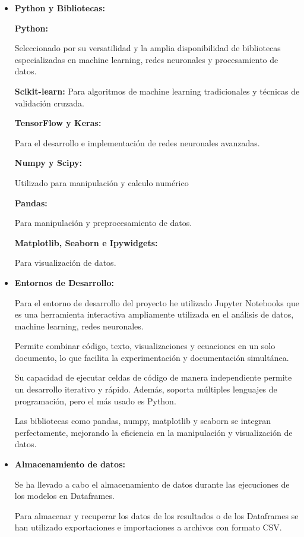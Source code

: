 \begin{itemize}
	
	\item
	\textbf{Python y Bibliotecas:}


\textbf{Python:}

Seleccionado por su versatilidad y la amplia disponibilidad de bibliotecas especializadas en machine learning, redes neuronales y procesamiento de datos.

\textbf{Scikit-learn:}
Para algoritmos de machine learning tradicionales y técnicas de validación cruzada.

\textbf{TensorFlow y Keras:} 

Para el desarrollo e implementación de redes neuronales avanzadas.

\textbf{Numpy y Scipy:}

Utilizado para manipulación y calculo numérico

\textbf{Pandas:} 

Para manipulación y preprocesamiento de datos.

\textbf{Matplotlib, Seaborn e Ipywidgets:} 

Para visualización de datos.

	\item
	\textbf{Entornos de Desarrollo:}

Para el entorno de desarrollo del proyecto he utilizado Jupyter Notebooks que es una herramienta interactiva ampliamente utilizada en el análisis de datos, machine learning, redes neuronales.

Permite combinar código, texto, visualizaciones y ecuaciones en un solo documento, lo que facilita la experimentación y documentación simultánea. 

Su capacidad de ejecutar celdas de código de manera independiente permite un desarrollo iterativo y rápido. Además, soporta múltiples lenguajes de programación, pero el más usado es Python. 

Las bibliotecas como pandas, numpy, matplotlib y seaborn se integran perfectamente, mejorando la eficiencia en la manipulación y visualización de datos.



	\item
	\textbf{Almacenamiento de datos:}

Se ha llevado a cabo el almacenamiento de datos durante las ejecuciones de los modelos en Dataframes.

Para almacenar y recuperar los datos de los resultados o de los Dataframes se han utilizado exportaciones e importaciones a archivos con formato CSV.

\end{itemize}	